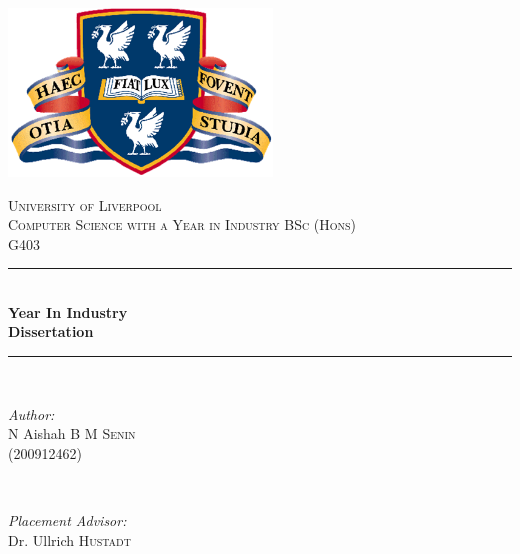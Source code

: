 \documentclass[12pt,a4paper,oneside]{report}
\begin{document}

\begin{titlepage}

\newcommand{\HRule}{\rule{\linewidth}{0.5mm}} %

\center %
 

\includegraphics[width=7cm]{images/logo/uol.png}

\vfill

\textsc{\LARGE University of Liverpool}\\[1.5cm] %
\textsc{\large Computer Science with a Year in Industry BSc (Hons)}\\[0.5cm] %
\textsc{\large G403}\\[0.5cm] %


\HRule \\[0.4cm]
{ \huge \bfseries Year In Industry \\ Dissertation}\\[0.4cm] %
\HRule \\[1.5cm]
 

\begin{minipage}{0.4\textwidth}
\begin{flushleft} \large
\emph{Author:}\\
N Aishah B M \textsc{Senin} \\ (200912462) %
\end{flushleft}
\end{minipage}
~
\begin{minipage}{0.4\textwidth}
\begin{flushright} \large
\emph{Placement Advisor:} \\
Dr. Ullrich \textsc{Hustadt} %
\end{flushright}
\end{minipage}\\[4cm]


\end{titlepage}
\end{document}
